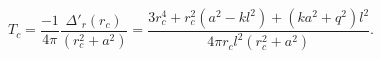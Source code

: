 \begin{equation}
T_{c}=\frac{-1}{4\pi}\frac{\Delta
'_{r}(r_{c})}{(r_c^2+a^2)}=\frac{3r_c^4+r_c^2(a^2-k
l^2)+(ka^2+q^2)l^2}{4\pi r_c l^2(r_c^2+a^2)}. \label{tem}
\end{equation}

